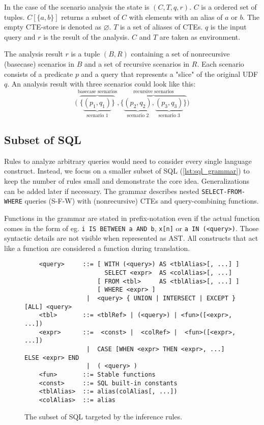 In the case of the scenario analysis the state is $(C, T, q, r)$. $C$ is a ordered set of tuples. $C[\{a, b\}]$ returns a subset of $C$ with elements with an alias of $a$ or $b$. The empty CTE-store is denoted as $\varnothing$. $T$ is a set of aliases of CTEs. $q$ is the input query and $r$ is the result of the analysis. $C$ and $T$ are taken as environment.

The analysis result $r$ is a tuple $(B, R)$ containing a set of nonrecursive (basecase) scenarios in $B$ and a set of recursive scenarios in $R$. Each scenario consists of a predicate $p$ and a query that represents a "slice" of the original UDF $q$. An analysis result with three scenarios could look like this:
$$
\Big(
    \overbrace{\big\{
        \underbrace{
            (p_1, q_1)
        }_{\text{scenario 1}}
    \big\}}^{\text{basecase scenarios}}
    ,
    \overbrace{\big\{
        \underbrace{
            (p_2, q_2)
        }_{\text{scenario 2}},
        \underbrace{
            (p_3, q_3)
        }_{\text{scenario 3}}
    \big\}}^{\text{recursive scenarios}}
\Big)
$$

\subsection{Subset of SQL}
Rules to analyze arbitrary queries would need to consider every single language construct. Instead, we focus on a smaller subset of SQL (\autoref{lst:sql_grammar}) to keep the number of rules small and demonstrate the core idea. Generalizations can be added later if necessary. The grammar describes nested \texttt{SELECT-FROM-WHERE} queries (S-F-W) with (nonrecursive) CTEs and query-combining functions.

Functions in the grammar are stated in prefix-notation even if the actual function comes in the form of eg. \texttt{i IS BETWEEN a AND b}, \texttt{x[n]} or \texttt{a IN (<query>)}. Those syntactic details are not visible when represented as AST. All constructs that act like a function are considered a function during translation.

\begin{figure}[H]
    \begin{verbatim}
    <query>     ::= [ WITH (<query>) AS <tblAlias>[, ...] ]
                      SELECT <expr>  AS <colAlias>[, ...]
                    [ FROM <tbl>     AS <tblAlias>[, ...] ]
                    [ WHERE <expr> ]
                 |  <query> { UNION | INTERSECT | EXCEPT } [ALL] <query>
    <tbl>       ::= <tblRef> | (<query>) | <fun>([<expr>, ...])
    <expr>      ::=  <const> |  <colRef> |  <fun>([<expr>, ...])
                 |  CASE [WHEN <expr> THEN <expr>, ...] ELSE <expr> END
                 |  ( <query> )
    <fun>       ::= Stable functions
    <const>     ::= SQL built-in constants
    <tblAlias>  ::= alias(colAlias[, ...])
    <colAlias>  ::= alias
    \end{verbatim}
    \caption{The subset of SQL targeted by the inference rules.}
    \label{lst:sql_grammar}
\end{figure}


